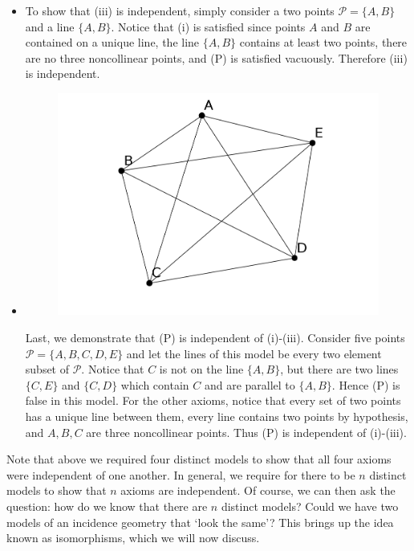 \documentclass[12pt]{book}
\def\cP{{\mathcal{P}}}
\begin{document}
\begin{itemize}
\item To show that (iii) is independent, simply consider a two points $\cP=\{A,B\}$ and a line $\{A,B\}$. Notice that (i) is satisfied since points $A$ and $B$ are contained on a unique line, the line $\{A,B\}$ contains at least two points, there are no three noncollinear points, and (P) is satisfied vacuously. Therefore (iii) is independent.

\item 
	\parbox[t]{\dimexpr\textwidth-\leftmargin}{%
      \vspace{-2.5mm}
      \begin{figure}
        \centering
        \vspace{-\baselineskip}
        \includegraphics[width=\linewidth]{images/P-independence.png}
      \end{figure}
	Last, we demonstrate that (P) is independent of (i)-(iii). Consider five points $\cP=\{A,B,C,D,E\}$ and let the lines of this model be every two element subset of $\cP$. Notice that $C$ is not on the line $\{A,B\}$, but there are two lines $\{C,E\}$ and $\{C,D\}$ which contain $C$ and are parallel to $\{A,B\}$. Hence (P) is false in this model. For the other axioms, notice that every set of two points has a unique line between them, every line contains two points by hypothesis, and $A,B,C$ are three noncollinear points. Thus (P) is independent of (i)-(iii).
    }
\end{itemize}

Note that above we required four distinct models to show that all four axioms were independent of one another. In general, we require for there to be $n$ distinct models to show that $n$ axioms are independent. Of course, we can then ask the question: how do we know that there are $n$ distinct models? Could we have two models of an incidence geometry that `look the same'? This brings up the idea known as isomorphisms, which we will now discuss.
\end{document}
